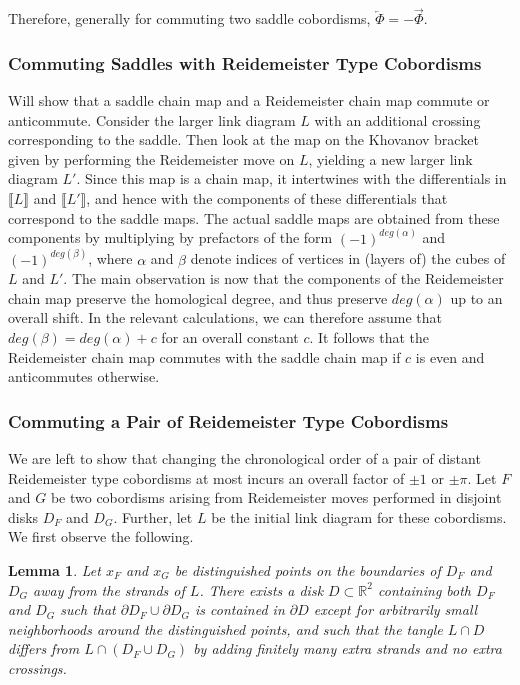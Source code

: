 \documentclass[12pt]{amsart}
\theoremstyle{definition}
\theoremstyle{plain}
\newtheorem{lemma}{Lemma}
\begin{document}
Therefore, generally for commuting two saddle cobordisms, $\overleftarrow{\Phi}=-\overrightarrow{\Phi}$.

\subsubsection{Commuting Saddles with Reidemeister Type Cobordisms}

Will show that a saddle chain map and a Reidemeister chain map commute or anticommute.
Consider the larger link diagram $L$ with an additional crossing corresponding to the saddle. 
Then look at the map on the Khovanov bracket given by performing the Reidemeister move on $L$, yielding
a new larger link diagram $L'$. Since this map is a chain map, it intertwines with the differentials in $\llbracket L\rrbracket$ and $\llbracket L'\rrbracket$,
and hence with the components of these differentials that correspond to the saddle maps.
The actual saddle maps are obtained from these components by multiplying by prefactors of the form
$(-1)^{deg(\alpha)}$ and $(-1)^{deg(\beta)}$, where $\alpha$ and $\beta$ denote
indices of vertices in (layers of) the cubes of $L$ and $L'$.
The main observation is now that the components of the Reidemeister chain map preserve the homological
degree, and thus preserve $deg(\alpha)$ up to an overall shift. In the relevant calculations, we can therefore assume that
$deg(\beta)=deg(\alpha)+c$ for an overall constant $c$. It follows that the Reidemeister chain map commutes with the
saddle chain map if $c$ is even and anticommutes otherwise.

\subsubsection{Commuting a Pair of Reidemeister Type Cobordisms}

We are left to show that changing the chronological order of a pair of distant Reidemeister type cobordisms at most incurs an overall
factor of $\pm 1$ or $\pm\pi$. Let $F$ and $G$ be two cobordisms arising from Reidemeister moves performed in disjoint disks $D_F$ and $D_G$.
Further, let $L$ be the initial link diagram for these cobordisms.
We first observe the following.

\begin{lemma}\label{lem:worm}
Let $x_F$ and $x_G$ be distinguished points on the boundaries of $D_F$ and $D_G$ away from the strands of $L$.
There exists a disk $D\subset\mathbb{R}^2$ containing both $D_F$ and $D_G$ such that $\partial D_F\cup \partial D_G$
is contained in $\partial D$ except for arbitrarily small neighborhoods around the distinguished points,
and such that the tangle $L\cap D$ differs from $L\cap(D_F\cup D_G)$ by adding finitely many extra
strands and no extra crossings.
\end{lemma}
\end{document}
